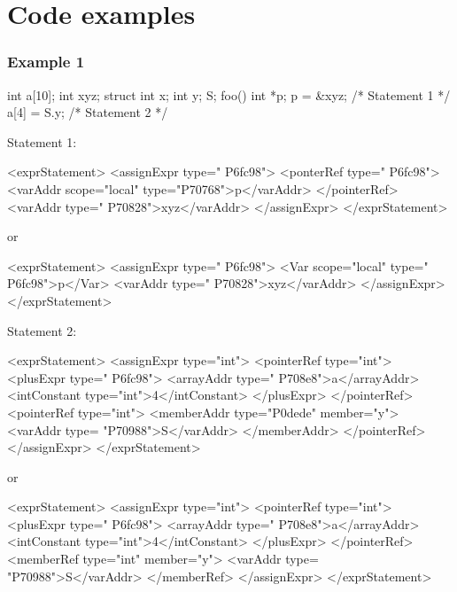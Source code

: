 \section{Code examples}

\subsubsection*{Example 1}

\begin{CExample}
  int a[10];
  int xyz;
  struct {    int x;   int y;} S;
  foo() {
  	int *p; 
  	p =  &xyz;	/* Statement 1 */
  	a[4] = S.y;	/* Statement 2 */
  }
\end{CExample}

Statement 1:
\vspace{2mm}

\begin{XcodeMLExample}
  <exprStatement>
    <assignExpr type=" P6fc98">
     <ponterRef type=" P6fc98">
        <varAddr scope="local" type="P70768">p</varAddr>
       </pointerRef>
      <varAddr type=" P70828">xyz</varAddr>
    </assignExpr>
  </exprStatement>
\end{XcodeMLExample}
 
or
\vspace{2mm}

\begin{XcodeMLExample}
  <exprStatement>
    <assignExpr type=" P6fc98">
    <Var scope="local" type=" P6fc98">p</Var>
       <varAddr type=" P70828">xyz</varAddr>
   </assignExpr>
  </exprStatement>
\end{XcodeMLExample}

Statement 2:
\vspace{2mm}

\begin{XcodeMLExample}
  <exprStatement>
   <assignExpr type="int">
      <pointerRef type="int">
        <plusExpr type=" P6fc98">
          <arrayAddr type=" P708e8">a</arrayAddr>
          <intConstant type="int">4</intConstant>
        </plusExpr>
     </pointerRef>
     <pointerRef type="int">
        <memberAddr type="P0dede" member="y">
           <varAddr type= "P70988">S</varAddr>
        </memberAddr>
    </pointerRef>
   </assignExpr>
  </exprStatement>
\end{XcodeMLExample}

or
\vspace{2mm}

\begin{XcodeMLExample}
  <exprStatement>
   <assignExpr type="int">
      <pointerRef type="int">
        <plusExpr type=" P6fc98">
          <arrayAddr type=" P708e8">a</arrayAddr>
          <intConstant type="int">4</intConstant>
        </plusExpr>
     </pointerRef>
     <memberRef type="int" member="y">
        <varAddr type= "P70988">S</varAddr>
    </memberRef>
   </assignExpr>
  </exprStatement>
\end{XcodeMLExample}

